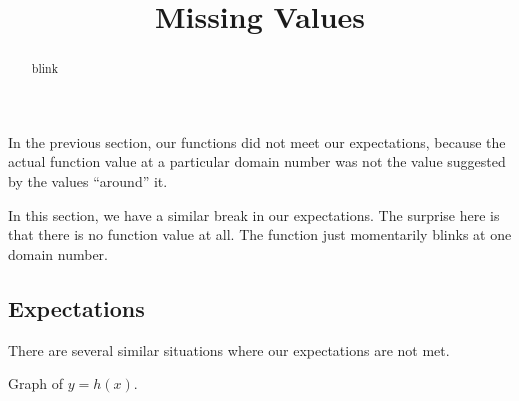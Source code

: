 \documentclass{ximera}
\title{Missing Values}
\begin{document}
\begin{abstract}
blink
\end{abstract}
\maketitle







In the previous section, our functions did not meet our expectations, because the actual function value at a particular domain number was not the value suggested by the values ``around'' it.



In this section, we have a similar break in our expectations. The surprise here is that there is no function value at all. The function just momentarily blinks at one domain number.



























\subsection{Expectations}

There are several similar situations where our expectations are not met.









Graph of $y = h(x)$.
\end{document}
